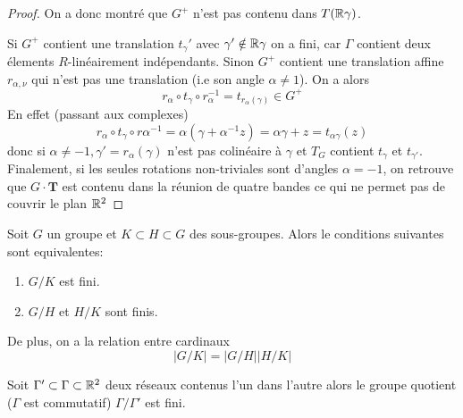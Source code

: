 \begin{proof}
	On a donc montré que $G^+$ n'est pas contenu dans $T(\mathbb{R} \gamma)$.

	Si $G^+$ contient une translation $t_\gamma'$ avec $\gamma' \notin \mathbb{R}\gamma$
	on a fini, car $\Gamma$ contient deux élements $R$-linéairement
	indépendants. Sinon $G^+$ contient une translation affine $r_{\alpha, \nu}$
	qui n'est pas une translation (i.e son angle $\alpha \neq 1$). On a alors
	\begin{equation*}
		r_\alpha \circ t_\gamma \circ r_\alpha^{-1} = t_{r_\alpha(\gamma)} \in G^+
	\end{equation*}
	En effet (passant aux complexes)
	\begin{equation*}
		r_\alpha \circ t_\gamma \circ r\alpha^{-1} = \alpha(\gamma + \alpha^{-1}z)
		= \alpha\gamma + z = t_{\alpha\gamma}(z)
	\end{equation*}
	donc si $\alpha \neq -1, \gamma' = r_\alpha(\gamma)$ n'est pas colinéaire à
	$\gamma$ et $T_G$ contient $t_\gamma$ et $t_{\gamma'}$.
	Finalement, si les seules rotations non-triviales sont d'angles $\alpha =
	-1$, on retrouve que $G\cdot\mathbf{T}$ est contenu dans la réunion de
	quatre bandes ce qui ne permet pas de couvrir le plan $\mathbb{R}^2$
\end{proof}

\begin{lemma}
	\label{lem:sous-groupes-finis}
	Soit $G$ un groupe et $K \subset H \subset G$ des sous-groupes. Alors le
	conditions suivantes sont equivalentes:
	\begin{enumerate}
		\item $G/K$ est fini.
		\item $G/H$ et $H/K$ sont finis.
	\end{enumerate}
	De plus, on a la relation entre cardinaux
	\begin{equation*}
		|G/K|=|G/H||H/K|
	\end{equation*}
\end{lemma}

\begin{proposition}
	Soit $\Gamma' \subset \Gamma \subset \mathbb{R}^2$ deux réseaux contenus l'un dans
	l'autre alors le groupe quotient ($\Gamma$ est commutatif) $\Gamma/\Gamma'$
	est fini.
\end{proposition}


